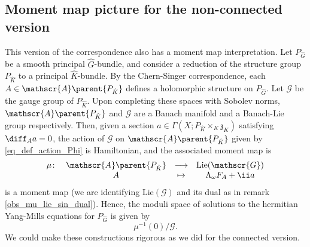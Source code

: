 \subsection{Moment map picture for the non-connected version}
This version of the correspondence also has a moment map interpretation. Let \(P_{\hat{G}}\) be a smooth principal \(\hat{G}\)-bundle, and consider a reduction of the structure group \(P_{\hat{K}}\) to a principal \(\hat{K}\)-bundle. By the Chern-Singer correspondence, each \(A \in \mathscr{A}\parent{P_{\hat{K}}}\) defines a holomorphic structure on \(P_{\hat{G}}\). Let \(\mathscr{G}\) be the gauge group of \(P_{\hat{K}}\). Upon completing these spaces with Sobolev norms, \(\mathscr{A}\parent{P_{\hat{K}}}\) and \(\mathscr{G}\) are a Banach manifold and a Banach-Lie group respectively. Then, given a section \(a \in \Gamma(X; P_{\hat{K}} \times_K \mathfrak{z}_K)\) satisfying \(\diff_A a=0\), the action of \(\mathscr{G}\) on \(\mathscr{A}\parent{P_{\hat{K}}}\) given by \eqref{eq_def_action_Phi} is Hamiltonian, and the associated moment map is 
\[
\begin{array}{cccc}
    \mu \colon & \mathscr{A}\parent{P_{\hat{K}}} & \longrightarrow & \mathrm{Lie}(\mathscr{G}) \\
    & A & \mapsto & \Lambda_\omega F_A +\ii a
\end{array}
\]
is a moment map (we are identifying \(\mathrm{Lie}(\mathscr{G})\) and its dual as in remark \ref{obs_mu_lie_sin_dual}). Hence, the moduli space of solutions to the hermitian Yang-Mills equations for \(P_{\hat{G}}\) is given by 
\[
\mu^{-1}(0)/\mathscr{G}.
\]
We could make these constructions rigorous as we did for the connected version.

